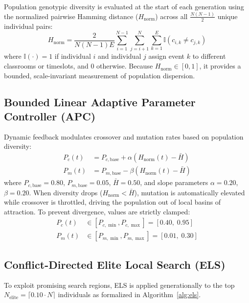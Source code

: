 \documentclass[journal]{IEEEtran}
\begin{document}
Population genotypic diversity is evaluated at the start of each generation using the normalized pairwise Hamming distance ($H_{\text{norm}}$) across all $\frac{N(N-1)}{2}$ unique individual pairs:
\begin{equation}
H_{\text{norm}} = \frac{2}{N(N-1)E} \sum_{i=1}^{N-1} \sum_{j=i+1}^N \sum_{k=1}^E \mathbb{I}(c_{i,k} \neq c_{j,k})
\end{equation}
where $\mathbb{I}(\cdot) = 1$ if individual $i$ and individual $j$ assign event $k$ to different classrooms or timeslots, and $0$ otherwise. Because $H_{\text{norm}} \in [0, 1]$, it provides a bounded, scale-invariant measurement of population dispersion.

\subsection{Bounded Linear Adaptive Parameter Controller (APC)}
Dynamic feedback modulates crossover and mutation rates based on population diversity:
\begin{align}
P_c(t) &= P_{c,\text{base}} + \alpha \left( H_{\text{norm}}(t) - \bar{H} \right) \\
P_m(t) &= P_{m,\text{base}} - \beta \left( H_{\text{norm}}(t) - \bar{H} \right)
\end{align}
where $P_{c,\text{base}} = 0.80$, $P_{m,\text{base}} = 0.05$, $\bar{H} = 0.50$, and slope parameters $\alpha = 0.20$, $\beta = 0.20$. When diversity drops ($H_{\text{norm}} < \bar{H}$), mutation is automatically elevated while crossover is throttled, driving the population out of local basins of attraction. To prevent divergence, values are strictly clamped:
\begin{align}
P_c(t) &\in [P_{c,\min}, P_{c,\max}] = [0.40, \; 0.95] \\
P_m(t) &\in [P_{m,\min}, P_{m,\max}] = [0.01, \; 0.30]
\end{align}

\subsection{Conflict-Directed Elite Local Search (ELS)}
To exploit promising search regions, ELS is applied generationally to the top $N_{\text{elite}} = \lceil 0.10 \cdot N \rceil$ individuals as formalized in Algorithm~\ref{alg:els}.
\end{document}
